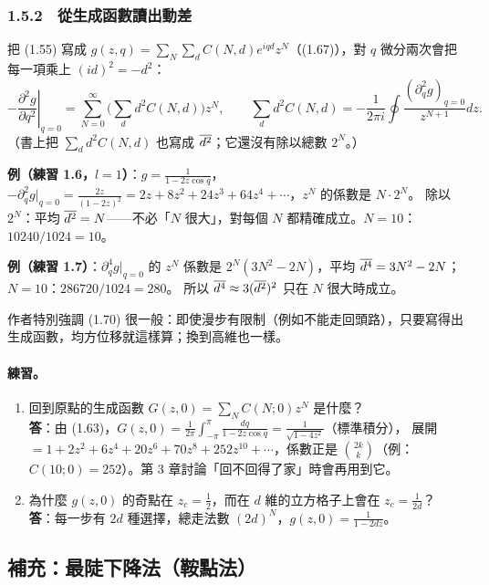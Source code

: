 \subsubsection*{1.5.2　從生成函數讀出動差}
把 (1.55) 寫成 $g(z,q)=\sum_N\sum_dC(N,d)e^{iqd}z^N$（(1.67)），對 $q$ 微分兩次會把每一項乘上 $(id)^2=-d^2$：
\begin{equation}
-\left.\frac{\partial^2g}{\partial q^2}\right|_{q=0}=\sum_{N=0}^\infty\Big(\sum_dd^2C(N,d)\Big)z^N,\qquad
\sum_dd^2C(N,d)=-\frac{1}{2\pi i}\oint\frac{(\partial_q^2g)_{q=0}}{z^{N+1}}dz. \tag{1.68--1.70}
\end{equation}
（書上把 $\sum_dd^2C(N,d)$ 也寫成 $\overline{d^2}$；它還沒有除以總數 $2^N$。）

\textbf{例（練習 1.6，$l=1$）}：$g=\frac1{1-2z\cos q}$，$-\partial_q^2g|_{q=0}=\frac{2z}{(1-2z)^2}=2z+8z^2+24z^3+64z^4+\cdots$，$z^N$ 的係數是 $N\cdot2^N$。
除以 $2^N$：平均 $\overline{d^2}=N$——不必「$N$ 很大」，對每個 $N$ 都精確成立。$N=10$：$10240/1024=10$。\par
\textbf{例（練習 1.7）}：$\partial_q^4g|_{q=0}$ 的 $z^N$ 係數是 $2^N(3N^2-2N)$，平均 $\overline{d^4}=3N^2-2N$；$N=10$：$286720/1024=280$。
所以 $\overline{d^4}\approx3(\overline{d^2})^2$ 只在 $N$ 很大時成立。

作者特別強調 (1.70) 很一般：即使漫步有限制（例如不能走回頭路），只要寫得出生成函數，均方位移就這樣算；換到高維也一樣。

\paragraph{練習。}
\begin{enumerate}[label=(\alph*)]
\item 回到原點的生成函數 $G(z,0)=\sum_NC(N;0)z^N$ 是什麼？\\
  \textbf{答}：由 (1.63)，$G(z,0)=\frac1{2\pi}\int_{-\pi}^{\pi}\frac{dq}{1-2z\cos q}=\frac{1}{\sqrt{1-4z^2}}$（標準積分），
  展開 $=1+2z^2+6z^4+20z^6+70z^8+252z^{10}+\cdots$，係數正是 $\binom{2k}{k}$（例：$C(10;0)=252$）。第 3 章討論「回不回得了家」時會再用到它。
\item 為什麼 $g(z,0)$ 的奇點在 $z_c=\frac1{2}$，而在 $d$ 維的立方格子上會在 $z_c=\frac{1}{2d}$？\\
  \textbf{答}：每一步有 $2d$ 種選擇，總走法數 $(2d)^N$，$g(z,0)=\frac{1}{1-2dz}$。
\end{enumerate}

\subsection{補充：最陡下降法（鞍點法）}

